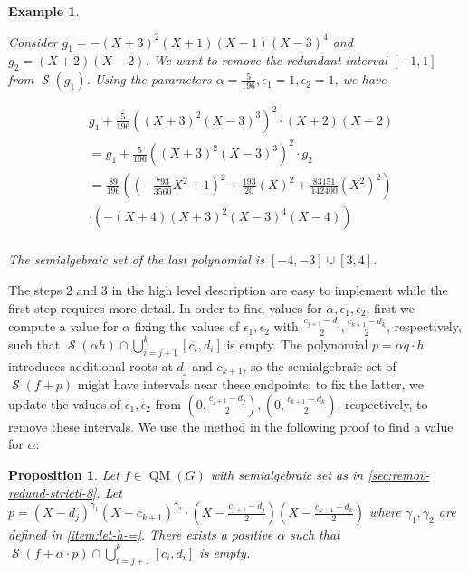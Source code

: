 \documentclass[preprint,12pt,authoryear]{elsarticle}
\newtheorem{proposition}[theorem]{Proposition}
\newtheorem{example}[theorem]{Example}
\newenvironment{example1}
  {\begin{example}\rm}
  {\end{example}}
\DeclareMathOperator{\quadmod}{QM}
\DeclareMathOperator{\semialgebraic}{\mathcal{S}}
\begin{document}
\begin{example1}
  \th\label{sec:remov-disj-interv-3}

 Consider $g_1 = -(X+3)^{2}(X+1)(X-1)(X-3)^{4}$ and
  $g_2 = (X + 2)(X - 2)$. We want to remove the redundant interval $[-1, 1]$
  from $\semialgebraic(g_1)$. Using the parameters
  $\alpha = \frac{5}{196}, \epsilon_1 = 1, \epsilon_2 = 1$, we have

  \begin{equation*} 
    \label{sec:remov-redund-strictl-4}
    \begin{split}
      &g_1 + \frac{5}{196}((X + 3)^{2}(X - 3)^{3})^{2} \cdot (X + 2)(X - 2)\\
      &= g_1 + \frac{5}{196}((X + 3)^{2}(X - 3)^{3})^{2} \cdot g_2\\
      &=
        \frac{89}{196}
        \left((-\frac{793}{3560}X^{2}+1)^2+\frac{193}{20}(X)^2
        +\frac{83151}{142400}(X^{2})^2\right)\\
      &\cdot (-(X + 4)(X + 3)^{2}(X - 
        3)^{4}(X - 4))\\ 
    \end{split}
  \end{equation*}

  The semialgebraic set of the last polynomial is $[-4, -3] \cup [3, 4]$.
\end{example1}

The steps 2 and 3 in the high level description are easy to implement while the
first step requires more detail. In order to find values for
$\alpha, \epsilon_1, \epsilon_2$, first we compute a value for $\alpha$ fixing
the values of $\epsilon_1, \epsilon_2$ with
$\frac{c_{j+1} - d_j}{2}, \frac{c_{k+1} - d_k}{2}$, respectively, such that
$\semialgebraic(\alpha h) \cap \bigcup_{i=j+1}^{k}{[c_i, d_i]}$ is empty. The
polynomial $p = \alpha q \cdot h$ introduces additional roots at $d_j$ and
$c_{k+1}$, so the semialgebraic set of $\semialgebraic(f + p)$ might have
intervals near these endpoints; to fix the latter, we update the values of
$\epsilon_1, \epsilon_2$ from
$(0, \frac{c_{j+1} - d_j}{2}), (0, \frac{c_{k+1} - d_k}{2})$, respectively,
 to remove these intervals. We use the method in the following proof to
find a value for $\alpha$:

\begin{proposition}
  \th\label{sec:remov-redund-strictl-7} Let $f \in \quadmod(G)$ with
  semialgebraic set as in \eqref{sec:remov-redund-strictl-8}. Let
  $p = (X - d_j)^{\gamma_1}(X - c_{k+1})^{\gamma_2} \cdot (X - \frac{c_{j+1} -
    d_j}{2})(X - \frac{c_{k+1} - d_k}{2})$ where $\gamma_1, \gamma_2$ are
  defined in \eqref{item:let-h-=}. There exists a positive $\alpha$ such that
  $\semialgebraic(f + \alpha \cdot p) \cap \bigcup_{i=j+1}^{k}{[c_i, d_i]}$ is
  empty.
\end{proposition}
\end{document}
